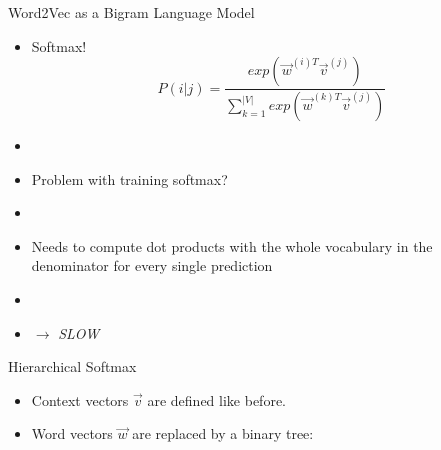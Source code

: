 \documentclass[11pt,compress,t,notes=noshow, xcolor=table]{beamer}
\begin{document}

\begin{frame}{Word2Vec as a Bigram Language Model}

\vfill

\begin{itemize}
	\item Softmax!
	$$P(i|j) = \frac{exp(\vec w^{(i)T} \vec v^{(j)})}{\sum_{k=1}^{|V|} exp(\vec w^{(k)T} \vec v^{(j)})}$$
	\item[]
	\item \ques Problem with training softmax?
	\pause
	\item[]
	\item[] Needs to compute dot products with the whole vocabulary in the denominator for every single prediction
	\item[]
	\item[] \centering $\rightarrow$ \textit{SLOW}
\end{itemize}

\vfill

\end{frame}


\iffalse

\begin{vbframe}{Hierarchical Softmax}

\vfill

\begin{itemize}
	\item Context vectors $\vec v$ are defined like before.
	\item Word vectors $\vec w$ are replaced by a binary tree:
\end{itemize}

\begin{center}
\end{center}

\vfill

\end{vbframe}
\end{document}
